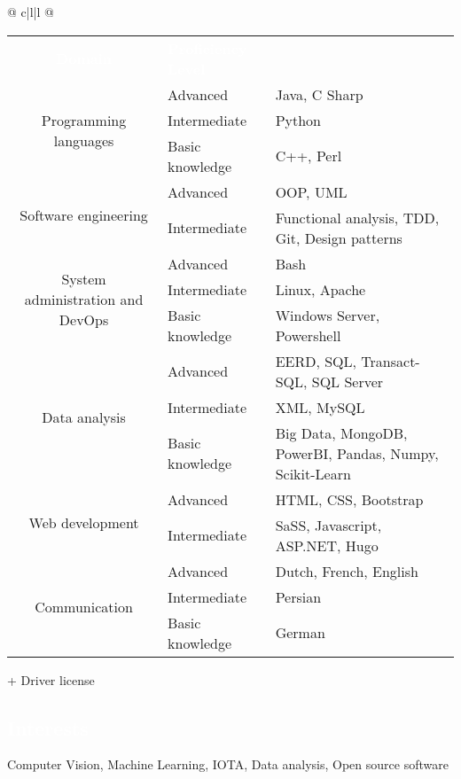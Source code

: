 \documentclass[a4paper, twoside]{article}
\begin{document}
\begin{tabu}{@{} c|l|l @{}}
\begin{tabular}{c|l|l @{}}
\cellcolor{blueDark}\textcolor{white}{\textbf{ Domain }} &
\cellcolor{blueDark}\textcolor{white}{\textbf{ Proficiency Level }} &
\cellcolor{blueDark}\\
\multirow{ 3 }{*}{ Programming languages }
& Advanced & Java, C Sharp \\
& Intermediate & Python \\
& Basic knowledge & C++, Perl \\
\hline
\multirow{ 2 }{*}{ Software engineering }
& Advanced & OOP, UML \\
& Intermediate & Functional analysis, TDD, Git, Design patterns \\
\hline
\multirow{ 3 }{*}{ System administration and DevOps }
& Advanced & Bash \\
& Intermediate & Linux, Apache \\
& Basic knowledge & Windows Server, Powershell \\
\hline
\multirow{ 3 }{*}{ Data analysis }
& Advanced & EERD, SQL, Transact-SQL, SQL Server \\
& Intermediate & XML, MySQL \\
& Basic knowledge & Big Data, MongoDB, PowerBI, Pandas, Numpy, Scikit-Learn \\
\hline
\multirow{ 2 }{*}{ Web development }
& Advanced & HTML, CSS, Bootstrap \\
& Intermediate & SaSS, Javascript, ASP.NET, Hugo \\
\hline
\multirow{ 3 }{*}{ Communication }
& Advanced & Dutch, French, English \\
& Intermediate & Persian \\
& Basic knowledge & German \\
\hline
\end{tabular}
\end{tabu}
\ignorespaces
\noindent + Driver license
\begin{mdframed}
\section*{\textcolor{white}{ Interests }}
\end{mdframed}
\noindent
Computer Vision, Machine Learning, IOTA, Data analysis, Open source software
\end{document}
